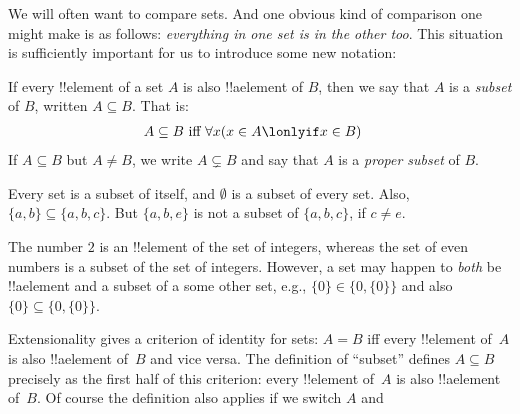 \documentclass[../../../include/open-logic-section]{subfiles}
\begin{document}
	

\begin{explain}
	We will often want to compare sets. And one obvious kind of comparison one might make is as follows: \emph{everything in one set is in the other too}. This situation is sufficiently important for us to introduce some new notation:
\end{explain}
\begin{defn}[Subset]
	If every !!{element} of a set $A$ is also !!a{element} of
	$B$, then we say that $A$ is a \emph{subset} of $B$, written $A
	\subseteq B$. That is: 
	\begin{align*}
			A \subseteq B&\text{ iff } \forall x(x \in A \lonlyif x \in B)
	\end{align*}
	If $A \subseteq B$ but $A \neq B$, we write $A \subsetneq B$ and say that $A$ is a \emph{proper subset} of $B$.
\end{defn}
\begin{ex}
	Every set is a subset of itself, and $\emptyset$ is a
	subset of every set. Also, $\{ a, b \} \subseteq \{ a, b, c \}$. But $\{ a, b, e \}$ is not a subset of $\{ a, b, c \}$, if $c \neq e$. 
\end{ex}
\begin{ex}
	The number $2$ is an !!{element} of the set of integers, whereas the set of even numbers is a subset of the set of integers. However, a set may happen to \emph{both} be 
	!!a{element} and a subset of a some other set, e.g., $\{0\} \in \{0, \{0\}\}$
	and also $\{0\} \subseteq \{0, \{0\}\}$.
\end{ex}\noindent
Extensionality gives a criterion of identity for sets: $A = B$ iff
	every !!{element} of~$A$ is also !!a{element} of~$B$ and vice versa.
	The definition of ``subset'' defines $A \subseteq B$ precisely as the first
	half of this criterion: every !!{element} of~$A$ is also !!a{element}
	of~$B$. Of course the definition also applies if we switch $A$ and
\end{document}
